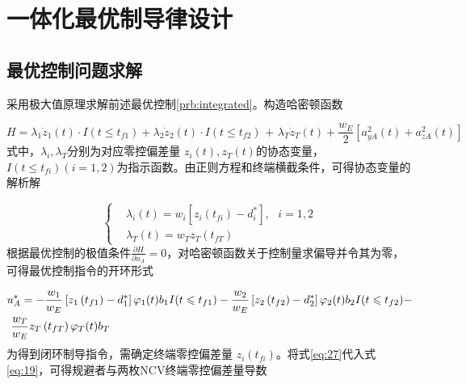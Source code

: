 \section{一体化最优制导律设计}
\subsection{最优控制问题求解}
采用极大值原理求解前述最优控制\cref{prb:integrated}。构造哈密顿函数

\begin{equation}
\label{eq:25}
H = {\lambda _1}{\dot z_1}(t) \cdot I(t \leqslant {t_{f1}}) + {\lambda _2}{\dot z_2}(t) \cdot I(t \leqslant {t_{f2}}){\text{ + }}{\lambda _T}{\dot z_T}(t) + \frac{{{w_E}}}{2}\left[ {a_{yA}^2(t) + a_{zA}^2(t)} \right]
\end{equation}
式中，${\lambda _i},{\lambda _T}$分别为对应零控偏差量 ${z_i}(t),{z_T}(t)$的协态变量，$I(t \leqslant {t_{fi}})(i = 1,2)$为指示函数。由正则方程和终端横截条件，可得协态变量的解析解

\begin{equation}
\label{eq:26}
\left\{
\begin{aligned}
& {\lambda _i}\left( t \right) = {w_i}\left[ {z_i\left( {{t_{fi}}} \right) - d_i^*} \right],{\text{ }}i = 1,2 \\
& {\lambda _T}\left( t \right) = {w_T}{z_T}\left( {{t_{fT}}} \right)
\end{aligned}
\right.
\end{equation}
根据最优控制的极值条件$\frac{{\partial H}}{{\partial {u_A}}} = 0$，对哈密顿函数关于控制量求偏导并令其为零，可得最优控制指令的开环形式

\begin{equation}
\label{eq:27}
\begin{gathered}
  u_A^* =  - \frac{{{w_1}}}{{{w_E}}}\left[ {{z_1}\left( {{t_{f1}}} \right) - d_1^*} \right]{\varphi _1}(t){b_1}I(t \leqslant {t_{f1}}) - \frac{{{w_2}}}{{{w_E}}}\left[ {{z_2}\left( {{t_{f2}}} \right) - d_2^*} \right]{\varphi _2}(t){b_2}I(t \leqslant {t_{f2}}) -  \hfill \\
  {\text{    }}\frac{{{w_T}}}{{{w_E}}}{z_T}\left( {{t_{fT}}} \right){\varphi _T}(t){b_T} \hfill \\ 
\end{gathered}
\end{equation}
为得到闭环制导指令，需确定终端零控偏差量 ${z_i}({t_{fi}})$。将式\eqref{eq:27}代入式\eqref{eq:19}，可得规避者与两枚NCV终端零控偏差量导数


